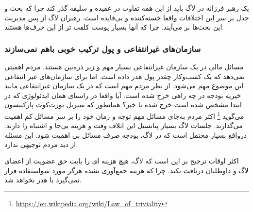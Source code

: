 یک رهبر فرزانه در لاگ باید از این همه تفاوت در عقیده و سلیقه گذر کند چرا که بحث و جدل
بر سر این اختلافات واقعا خسته‌کننده و بی‌فایده است. رهبران لاگ از پس مدیریت این بحث‌ها 
بر می‌آیند. چرا که آنها بسیار پوست کلفت تر از این حرف‌ها هستند.

\subsubsection{سازمان‌های غیرانتفاعی و پول ترکیب خوبی باهم نمی‌سازند}

مسائل مالی در یک سازمان غیرانتفاعی بسیار مهم و زیر ذره‌بین هستند. مردم اهمیتی نمی‌دهد
که یک کسب‌وکار چقدر پول هدر داده است. اما برای سازمان‌های غیر انتفاعی این موضوع مهم می‌شود.
از نظر مردم مهم است که در یک سازمان غیرانتفاعی مانند خیریه بودجه در چه راهی خرج شده است.
آیا واقعا در راستای همان ایدئولوژی که در ابتدا مشخص شده است خرج شده یا خیر؟
همانطور که سیریل نورث‌کوت پارکینسون می‌گوید
\footnote{\url{https://en.wikipedia.org/wiki/Law_of_triviality}}
اکثر مردم به‌جای مسائل مهم توجه و زمان خود را بر سر مسائل کم اهمیت می‌گذارند.
جلسات لاگ بسیار پتانسیل این اتلاف وقت و هزینه بی‌جا و اشتباه را دارند. درواقع بسیار محتمل است
که در لاگ، بودجه صرف مسائل بی اهمیت شود. این مسئله از دید مردم توجیهی ندارد.

اکثر اوقات ترجیح بر این است که لاگ، هیچ هزینه ای را بابت حق عضویت از اعضای لاگ و داوطلبان دریافت نکند.
چرا که هزینه جمع‌آوری نشده هرگز مورد سواستفاده قرار نمی‌گیرد یا هدر نخواهد شد.

